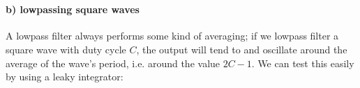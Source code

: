 \documentclass[11pt]{article}
\begin{document}
    \begin{center}
    \end{center}
    { \hspace*{\fill} \\}
    
    \paragraph{b) lowpassing square waves}\label{b-lowpassing-square-waves}

A lowpass filter always performs some kind of averaging; if we lowpass
filter a square wave with duty cycle \(C\), the output will tend to and
oscillate around the average of the wave's period, i.e. around the value
\(2C-1\). We can test this easily by using a leaky integrator:
\end{document}
